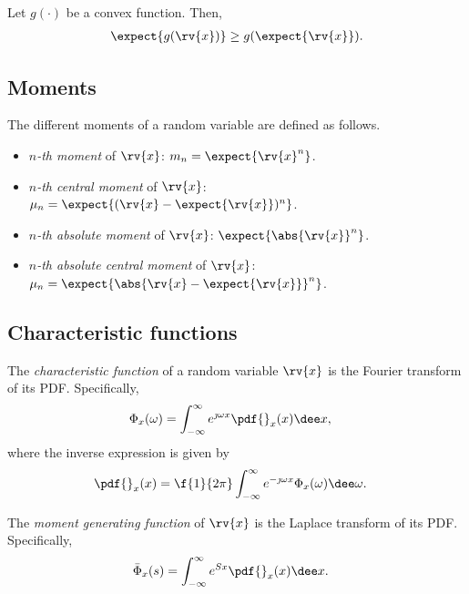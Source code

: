 \begin{mytheorem}
    Let $g(\cdot)$ be a convex function. Then, 
    \begin{align}
        \expect{g(\rv{x})} \geq g(\expect{\rv{x}}).
    \end{align}
\end{mytheorem}

\subsection{Moments}

\begin{mydefinition}[Moments] 
    \label{def:moments single rv}
    The different moments of a random variable are defined as follows.   
    \begin{itemize}
        \item \emph{$n$-th moment} of $\rv{x}$: $m_{n}=\expect{\rv{x}^{n}}$.
        \item \emph{$n$-th central moment} of $\rv{x}$: $\mu_{n}=\expect{(\rv{x}-\expect{\rv{x}})^{n}}$.
        \item \emph{$n$-th absolute moment} of $\rv{x}$: $\expect{\abs{\rv{x}}^{n}}$.
        \item \emph{$n$-th absolute central moment} of $\rv{x}$: $\mu_{n}=\expect{\abs{\rv{x}-\expect{\rv{x}}}^{n}}$.
    \end{itemize}
\end{mydefinition}

\subsection{Characteristic functions}
\begin{mydefinition}
  The \emph{characteristic function} of a random variable $\rv{x}$ is the Fourier transform of its PDF. Specifically,
  \begin{align}
      \Phi_{x}(\omega) &= \int_{-\infty}^{\infty} e^{\jmath \omega x}\pdf{}_{x}(x)\dee x,
  \end{align}
  where the inverse expression is given by
  \begin{align}
      \pdf{}_{x}(x) &= \f{1}{2\pi}\int_{-\infty}^{\infty} e^{-\jmath\omega x}\Phi_{x}(\omega) \dee \omega.
  \end{align}
\end{mydefinition}
\begin{mydefinition}
  The \emph{moment generating function} of $\rv{x}$ is the Laplace transform of its PDF. Specifically, 
  \begin{align}
      \bar{\Phi}_{x}(s) &= \int_{-\infty}^{\infty} e^{Sx}\pdf{}_{x}(x)\dee x.
  \end{align}
\end{mydefinition}

